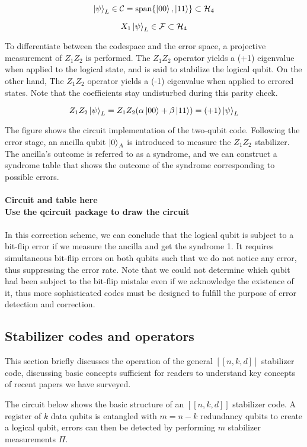 \documentclass[final,5p,times,twocolumn,authoryear]{elsarticle}
\begin{document}
\[
    \ket{\psi}_L \in \mathcal{C} = \text{span}\{\ket{00}, \ket{11}\} \subset \mathcal{H}_4
\]

\[
    X_1 \ket{\psi}_L \in \mathcal{F} \subset \mathcal{H}_4
\]

To differentiate between the codespace and the error space, a projective measurement of $Z_1Z_2$ is performed. The $Z_1Z_2$ operator yields a (+1) eigenvalue when applied to the logical state, and is said to stabilize the logical qubit. On the other hand, The $Z_1Z_2$ operator yields a (-1) eigenvalue when applied to errored states. Note that the coefficients stay undisturbed during this parity check.

\[
    Z_1Z_2\ket{\psi}_L = Z_1Z_2(\alpha \ket{00} + \beta \ket{11}) = (+1) \ket{\psi}_L
\]

The figure shows the circuit implementation of the two-qubit code. Following the error stage, an ancilla qubit $\ket{0}_A$ is introduced to measure the $Z_1Z_2$ stabilizer. The ancilla's outcome is referred to as a syndrome, and we can construct a syndrome table that shows the outcome of the syndrome corresponding to possible errors.
\\
\\
\textbf{Circuit and table here}
\\
\textbf{Use the qcircuit package to draw the circuit}
\\
\\
In this correction scheme, we can conclude that the logical qubit is subject to a bit-flip error if we measure the ancilla and get the syndrome 1. It requires simultaneous bit-flip errors on both qubits such that we do not notice any error, thus suppressing the error rate. Note that we could not determine which qubit had been subject to the bit-flip mistake even if we acknowledge the existence of it, thus more sophisticated codes must be designed to fulfill the purpose of error detection and correction.

\subsection{Stabilizer codes and operators}

This section briefly discusses the operation of the general $[[n, k, d]]$ stabilizer code, discussing basic concepts sufficient for readers to understand key concepts of recent papers we have surveyed.

The circuit below shows the basic structure of an $[[n,k,d]]$ stabilizer code. A register of $k$ data qubits is entangled with $m = n - k$ redundancy qubits to create a logical qubit, errors can then be detected by performing $m$ stabilizer measurements $\Pi$. 
\end{document}
